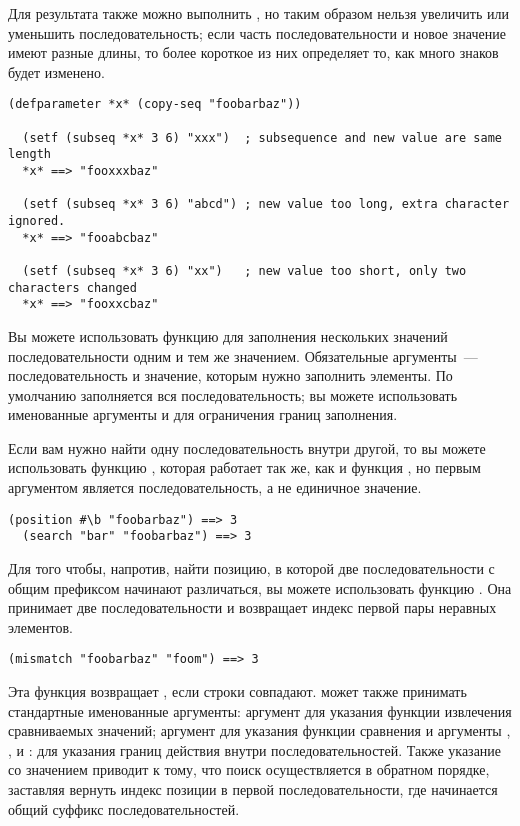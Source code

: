 Для результата  также можно выполнить , но таким образом нельзя увеличить
или уменьшить последовательность; если часть последовательности и новое значение имеют
разные длины, то более короткое из них определяет то, как много знаков будет изменено.

\begin{lstlisting}[style=lisprepl]
  (defparameter *x* (copy-seq "foobarbaz"))

  (setf (subseq *x* 3 6) "xxx")  ; subsequence and new value are same length
  *x* ==> "fooxxxbaz"

  (setf (subseq *x* 3 6) "abcd") ; new value too long, extra character ignored.
  *x* ==> "fooabcbaz"

  (setf (subseq *x* 3 6) "xx")   ; new value too short, only two characters changed
  *x* ==> "fooxxcbaz"
\end{lstlisting}

Вы можете использовать функцию  для заполнения нескольких значений
последовательности одним и тем же значением.  Обязательные аргументы~---
последовательность и значение, которым нужно заполнить элементы.  По умолчанию
заполняется вся последовательность; вы можете использовать именованные аргументы
 и  для ограничения границ заполнения.

Если вам нужно найти одну последовательность внутри другой, то вы можете использовать
функцию , которая работает так же, как и функция , но первым
аргументом является последовательность, а не единичное значение.

\begin{lstlisting}[style=lisprepl]
  (position #\b "foobarbaz") ==> 3
  (search "bar" "foobarbaz") ==> 3
\end{lstlisting}

Для того чтобы, напротив, найти позицию, в которой две последовательности с общим
префиксом начинают различаться, вы можете использовать функцию .  Она
принимает две последовательности и возвращает индекс первой пары неравных элементов.

\begin{lstlisting}[style=lisprepl]
  (mismatch "foobarbaz" "foom") ==> 3
\end{lstlisting}

Эта функция возвращает , если строки совпадают.  может также
принимать стандартные именованные аргументы: аргумент  для указания функции
извлечения сравниваемых значений; аргумент  для указания функции сравнения и
аргументы , ,  и : для указания границ
действия внутри последовательностей.  Также указание  со значением
 приводит к тому, что поиск осуществляется в обратном порядке, заставляя
 вернуть индекс позиции в первой последовательности, где начинается общий
суффикс последовательностей.

